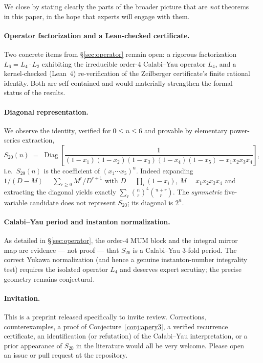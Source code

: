 \documentclass[11pt,a4paper]{article}
\theoremstyle{definition}
\theoremstyle{remark}
\newcommand{\Sx}{S_{20}}
\DeclareMathOperator{\diag}{Diag}
\begin{document}
We close by stating clearly the parts of the broader picture that are
\emph{not} theorems in this paper, in the hope that experts will engage with
them.

\paragraph{Operator factorization and a Lean-checked certificate.}
Two concrete items from \S\ref{sec:operator} remain open: a rigorous
factorization $L_6=L_4\cdot L_2$ exhibiting the irreducible order-$4$
Calabi--Yau operator $L_4$, and a kernel-checked (Lean~4) re-verification of the
Zeilberger certificate's finite rational identity. Both are self-contained and
would materially strengthen the formal status of the results.

\paragraph{Diagonal representation.}
We observe the identity, verified for $0\le n\le 6$ and provable by elementary
power-series extraction,
\[
  \Sx(n) \;=\; \diag\!\left[\frac{1}{(1-x_1)(1-x_2)(1-x_3)(1-x_4)(1-x_5)
  - x_1x_2x_3x_4}\right],
\]
i.e.\ $\Sx(n)$ is the coefficient of $(x_1\cdots x_5)^n$.  Indeed expanding
$1/(D-M)=\sum_{r\ge0}M^r/D^{r+1}$ with $D=\prod_i(1-x_i)$, $M=x_1x_2x_3x_4$ and
extracting the diagonal yields exactly $\sum_{r}\binom{n}{r}^4\binom{n+r}{r}$.
The \emph{symmetric} five-variable candidate does not represent $\Sx$; its
diagonal is $2^n$.

\paragraph{Calabi--Yau period and instanton normalization.}
As detailed in \S\ref{sec:operator}, the order-$4$ MUM block and the integral
mirror map are evidence --- not proof --- that $\Sx$ is a Calabi--Yau $3$-fold
period. The correct Yukawa normalization (and hence a genuine instanton-number
integrality test) requires the isolated operator $L_4$ and deserves expert
scrutiny; the precise geometry remains conjectural.

\paragraph{Invitation.}
This is a preprint released specifically to invite review.  Corrections,
counterexamples, a proof of Conjecture~\ref{conj:apery3}, a verified recurrence
certificate, an identification (or refutation) of the Calabi--Yau
interpretation, or a prior appearance of $\Sx$ in the literature would all be
very welcome.  Please open an issue or pull request at the repository.
\end{document}
